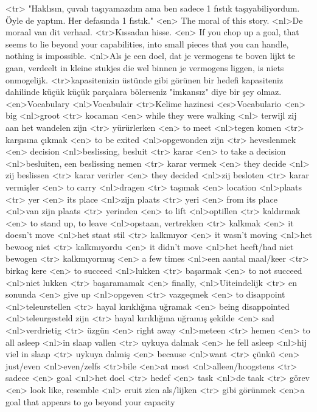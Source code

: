 <tr> "Haklısın, çuvalı taşıyamazdım ama ben sadece 1 fıstık taşıyabiliyordum. Öyle de yaptım. Her defasında 1 fıstık." 
<en> The moral of this story. 
<nl>De moraal van dit verhaal. 
<tr>Kıssadan hisse.
<en> If you chop up a goal, that seems to lie beyond your capabilities, into small pieces that you can handle, nothing is impossible.
<nl>Als je een doel, dat je vermogens te boven lijkt te gaan, verdeelt in kleine stukjes die wel binnen je vermogens liggen, is niets onmogelijk. 
<tr>kapasitenizin üstünde gibi görünen bir hedefi kapasiteniz dahilinde küçük küçük parçalara bölerseniz "imkansız" diye bir şey olmaz. 
<en>Vocabulary
<nl>Vocabulair
<tr>Kelime hazinesi
<es>Vocabulario
<en> big 
<nl>groot 
<tr> kocaman 
<en> while they were walking 
<nl> terwijl zij aan het wandelen zijn 
<tr> yürürlerken
<en> to meet 
<nl>tegen komen 
<tr> karşısına çıkmak 
<en> to be exited 
<nl>opgewonden zijn 
<tr> heveslenmek 
<en> decision 
<nl>beslissing, besluit 
<tr>  karar 
<en> to take a decision 
<nl>besluiten, een beslissing nemen 
<tr> karar vermek 
<en> they decide 
<nl> zij beslissen 
<tr> karar verirler 
<en> they decided
<nl>zij besloten 
<tr> karar vermişler
<en> to carry 
<nl>dragen 
<tr> taşımak
<en> location 
<nl>plaats 
<tr> yer 
<en> its place 
<nl>zijn plaats 
<tr> yeri  
<en> from its place 
<nl>van zijn plaats 
<tr> yerinden 
<en> to lift 
<nl>optillen 
<tr> kaldırmak 
<en>  to stand up, to leave 
<nl>opstaan, vertrekken 
<tr> kalkmak 
<en> it doesn't move 
<nl>het staat stil 
<tr> kalkmıyor 
<en> it wasn't moving 
<nl>het bewoog niet 
<tr> kalkmıyordu   
<en> it didn't move 
<nl>het heeft/had niet bewogen 
<tr>  kalkmıyormuş 
<en> a few times  
<nl>een aantal maal/keer 
<tr> birka\c{c} kere 
<en> to succeed 
<nl>lukken 
<tr> başarmak 
<en> to not succeed 
<nl>niet  lukken 
<tr> başaramamak 
<en> finally, 
<nl>Uiteindelijk 
<tr> en sonunda 
<en> give up 
<nl>opgeven 
<tr> vazgeçmek 
<en> to disappoint 
<nl>teleurstellen 
<tr> hayal kırıklığına uğramak 
<en> being disappointed 
<nl>teleurgesteld zijn 
<tr> hayal kırıklığına uğramış şekilde 
<en> sad 
<nl>verdrietig 
<tr> üzgün
<en> right away 
<nl>meteen 
<tr> hemen 
<en> to all asleep 
<nl>in slaap vallen 
<tr> uykuya dalmak
<en> he fell asleep 
<nl>hij viel in slaap 
<tr> uykuya dalmiş 
<en> because 
<nl>want 
<tr> çünkü  
<en> just/even  
<nl>even/zelfs 
<tr>bile  
<en>at most 
<nl>alleen/hoogstens 
<tr> sadece
<en> goal 
<nl>het  doel 
<tr> hedef 
<en> task 
<nl>de taak 
<tr> görev 
<en> look like, resemble 
<nl> eruit zien als/lijken 
<tr> gibi görünmek 
<en>a goal that appears to go beyond your capacity 
